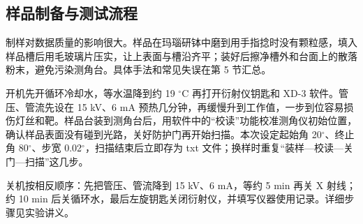 \subsection{样品制备与测试流程}

制样对数据质量的影响很大。样品在玛瑙研钵中磨到用手指捻时没有颗粒感，填入样品槽后用毛玻璃片压实，让上表面与槽沿齐平；装好后擦净槽外和台面上的散落粉末，避免污染测角台。具体手法和常见失误在第 5 节汇总。

开机先开循环冷却水，等水温降到约 19 $^\circ$C 再打开衍射仪钥匙和 XD-3 软件。管压、管流先设在 15 kV、6 mA 预热几分钟，再缓慢升到工作值，一步到位容易损伤灯丝和靶。样品台装到测角台后，用软件中的“校读”功能校准测角仪初始位置，确认样品表面没有碰到光路，关好防护门再开始扫描。本次设定起始角 20$^\circ$、终止角 80$^\circ$、步宽 0.02$^\circ$，扫描结束后立即存为 txt 文件；换样时重复“装样—校读—关门—扫描”这几步。

关机按相反顺序：先把管压、管流降到 15 kV、6 mA，等约 5 min 再关 X 射线；约 10 min 后关循环水，最后左旋钥匙关闭衍射仪，并填写仪器使用记录。详细步骤见实验讲义\cite{shi2024xrdlab}。
